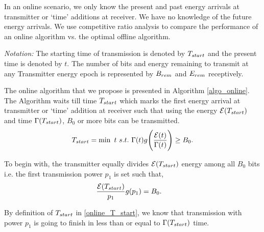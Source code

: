 In an online scenario, we only know the present and past energy arrivals at transmitter or `time' additions at receiver. We have no knowledge of the future energy arrivals. We use competitive ratio analysis to compare the performance of an online algorithm vs. the optimal offline algorithm.  
 
\textit{Notation:} The starting time of transmission is denoted by $T_{\mbox{\scriptsize{start}}}$ and the present time is denoted by $t$. The number of bits and energy remaining to transmit at any Transmitter energy epoch is represented by $B_{\mbox{\scriptsize{rem}}}$ and $E_{\mbox{\scriptsize{rem}}}$ receptively.

The online algorithm that we propose is presented in Algorithm \ref{algo_online}. The Algorithm waits till time $T_{\mbox{\scriptsize{start}}}$ which marks the first energy arrival at transmitter or `time' addition at receiver such that using the energy $\ETx(T_{\mbox{\scriptsize{start}}})$ and time $\TRx(T_{\mbox{\scriptsize{start}}})$, $B_0$ or more bits can be transmitted.
\begin{equation}
T_{\mbox{\scriptsize{start}}}=\min\ t \ s.t.\  \TRx(t)g\Bigg{(} \dfrac{\ETx(t)}{\TRx(t)}\Bigg{)}\ge B_0.\label{online_T_start}
\end{equation}

To begin with, the transmitter equally divides $\ETx(T_{\mbox{\scriptsize{start}}})$ energy among all $B_0$ bits i.e. the first transmission power $p_1$ is set such that,
\begin{align}
&\frac{\ETx(T_{\mbox{\scriptsize{start}}})}{p_1}g(p_1)=B_0.
\end{align}

By definition of $T_{\mbox{\scriptsize{start}}}$ in \eqref{online_T_start}, we know that transmission with power $p_1$ is going to finish in less than or equal to  $\TRx(T_{\mbox{\scriptsize{start}}})$ time.

